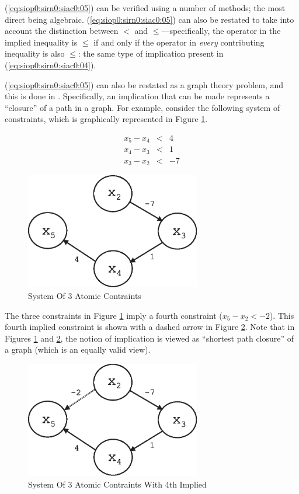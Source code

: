 \noindent{}(\ref{eq:siop0:sirn0:siac0:05}) can be verified using a number of methods; 
the most direct being algebraic.  (\ref{eq:siop0:sirn0:siac0:05})
can also be restated to take into account the distinction between
$<$ and $\leq$---specifically, the operator in the implied inequality
is $\leq$ if and only if the operator in \emph{every} contributing inequality is
also $\leq$:  the same type of implication present in 
(\ref{eq:siop0:sirn0:siac0:04}).

(\ref{eq:siop0:sirn0:siac0:05}) can also be restated as a graph
theory problem, and this is done in 
\cite{bib:p:thsu2k:kglppet}.  Specifically, an implication that can
be made represents a ``closure'' of a path in a graph. For example,
consider the following system of constraints, which is graphically
represented in Figure \ref{fig:siop0:sirn0:siac0:00}.

\begin{eqnarray}
\label{eq:siop0:sirn0:siac0:06} 
   x_5 - x_4 & < & 4 \\
\label{eq:siop0:sirn0:siac0:07}
   x_4 - x_3 & < & 1 \\
\label{eq:siop0:sirn0:siac0:08}
   x_3 - x_2 & < & -7
\end{eqnarray}

\begin{figure}
\centering
\includegraphics[height=2.0in]{s_iop0/impl01.eps}
\caption{System Of 3 Atomic Contraints}
\label{fig:siop0:sirn0:siac0:00}
\end{figure}

The three constraints in 
Figure \ref{fig:siop0:sirn0:siac0:00} imply a fourth
constraint ($x_5 - x_2 < -2$).  This fourth
implied constraint is shown with a dashed arrow in
Figure \ref{fig:siop0:sirn0:siac0:01}.  Note that
in Figures \ref{fig:siop0:sirn0:siac0:00} and
\ref{fig:siop0:sirn0:siac0:01}, the notion of implication
is viewed as ``shortest path closure'' of a graph (which is an equally
valid view).

\begin{figure}
\centering
\includegraphics[height=2.0in]{s_iop0/impl02.eps}
\caption{System Of 3 Atomic Contraints With 4th Implied}
\label{fig:siop0:sirn0:siac0:01}
\end{figure}


